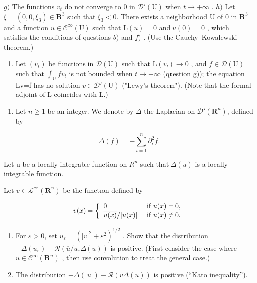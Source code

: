 \(g)\) The functions \(v_{t}\) do not converge to 0 in \(\mathcal{D}'(\mathrm{U})\) when \(t\to+\infty\) . \(h)\) Let \(\xi=(0,0,\xi_{3})\in\mathbf{R}^{3}\) such that \(\xi_{3}<0\). There exists a neighborhood U of 0 in \(\mathbf{R}^{3}\) and a function \(u\in\mathcal{C}^{\infty}(\mathrm{U})\) such that \(\mathrm{L}(u)=0\) and \(u(0)=0\) , which satisfies the conditions of questions \(b)\) and \(f)\) . (Use the Cauchy–Kowalewski theorem.)

\begin{enumerate}
\def\labelenumi{\roman{enumi})}
\tightlist
\item
  Let \((v_{t})\) be functions in \(\mathcal{D}(\mathrm{U})\) such that \(\mathrm{L}(v_{t})\to0\) , and \(f\in\mathcal{D}(\mathrm{U})\) such that \(\int_{\mathrm{U}}fv_{t}\) is not bounded when \(t\to+\infty\) (question g)); the equation Lv=f has no solution \(v\in\mathcal{D}'(\mathrm{U})\) ("Lewy's theorem"). (Note that the formal adjoint of L coincides with L.)
\end{enumerate}

\begin{enumerate}
\def\labelenumi{\arabic{enumi})}
\setcounter{enumi}{31}
\tightlist
\item
  Let \(n \geqslant 1\) be an integer. We denote by \(\Delta\) the Laplacian on \(\mathcal{D}'(\mathbf{R}^n)\), defined by
\end{enumerate}

\[
\Delta (f) = - \sum_ {i = 1} ^ {n} \partial_ {i} ^ {2} f.
\]

Let u be a locally integrable function on \(R^{n}\) such that \(\Delta(u)\) is a locally integrable function.

Let \(v\in \mathcal{L}^{\infty}(\mathbf{R}^{n})\) be the function defined by

\[
v (x) = \left\{ \begin{array}{l l} 0 & \text { if } u (x) = 0, \\ \overline {{u (x)}} / | u (x) | & \text { if } u (x) \neq 0. \end{array} \right.
\]

\begin{enumerate}
\def\labelenumi{\alph{enumi})}
\item
  For \(\varepsilon > 0\), set \(u_{\varepsilon} = (|u|^2 + \varepsilon^2)^{1/2}\) . Show that the distribution \(-\Delta(u_{\varepsilon}) - \mathcal{R}(\overline{u}/u_{\varepsilon} \Delta(u))\) is positive. (First consider the case where \(u \in \mathcal{C}^{\infty}(\mathbf{R}^{n})\) , then use convolution to treat the general case.)
\item
  The distribution \(-\Delta(|u|) - \mathcal{R}(v\Delta(u))\) is positive (“Kato inequality”).
\end{enumerate}

